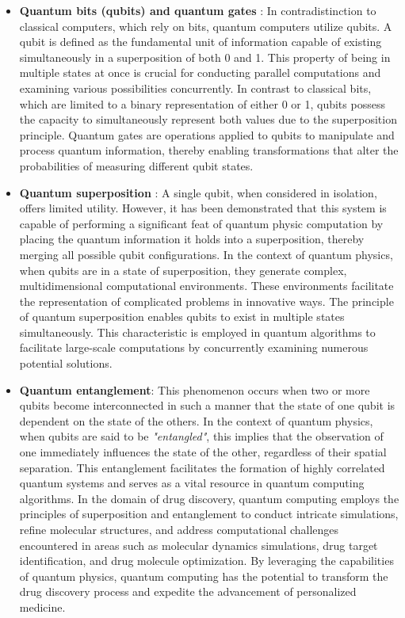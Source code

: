 \begin{tcolorbox}
	\begin{itemize}
		\item \textbf{\textcolor{codepurple!80}{Quantum bits (qubits) and quantum gates}} : In contradistinction to classical computers, which rely on bits, quantum computers utilize qubits. A qubit is defined as the fundamental unit of information capable of existing simultaneously in a superposition of both 0 and 1. This property of being in multiple states at once is crucial for conducting parallel computations and examining various possibilities concurrently. In contrast to classical bits, which are limited to a binary representation of either 0 or 1, qubits possess the capacity to simultaneously represent both values due to the superposition principle. Quantum gates are operations applied to qubits to manipulate and process quantum information, thereby enabling transformations that alter the probabilities of measuring different qubit states.
		
		\item \textbf{\textcolor{codegreen!85}{Quantum superposition}} : A single qubit, when considered in isolation, offers limited utility. However, it has been demonstrated that this system is capable of performing a significant feat of quantum physic computation by placing the quantum information it holds into a superposition, thereby merging all possible qubit configurations. In the context of quantum physics, when qubits are in a state of superposition, they generate complex, multidimensional computational environments. These environments facilitate the representation of complicated problems in innovative ways. The principle of quantum superposition enables qubits to exist in multiple states simultaneously. This characteristic is employed in quantum algorithms to facilitate large-scale computations by concurrently examining numerous potential solutions.
		
		\item \textbf{\textcolor{codeblue!85}{Quantum entanglement}}: This phenomenon occurs when two or more qubits become interconnected in such a manner that the state of one qubit is dependent on the state of the others. In the context of quantum physics, when qubits are said to be \emph{"entangled"}, this implies that the observation of one immediately influences the state of the other, regardless of their spatial separation. This entanglement facilitates the formation of highly correlated quantum systems and serves as a vital resource in quantum computing algorithms. In the domain of drug discovery, quantum computing employs the principles of superposition and entanglement to conduct intricate simulations, refine molecular structures, and address computational challenges encountered in areas such as molecular dynamics simulations, drug target identification, and drug molecule optimization. By leveraging the capabilities of quantum physics, quantum computing has the potential to transform the drug discovery process and expedite the advancement of personalized medicine.
	\end{itemize}
\end{tcolorbox}
